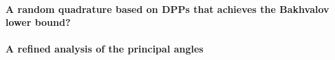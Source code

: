 \documentclass[twoside,11pt]{book}
\numberwithin{theorem}{chapter}
\numberwithin{definition}{chapter}
\numberwithin{proposition}{chapter}
\numberwithin{corollary}{chapter}
\numberwithin{example}{chapter}
\numberwithin{lemma}{chapter}
\numberwithin{assumption}{chapter}
\begin{document}
\paragraph{A random quadrature based on DPPs that achieves the Bakhvalov lower bound?}
\paragraph{A refined analysis of the principal angles}

\listoffigures

\listoftables





\end{document}
